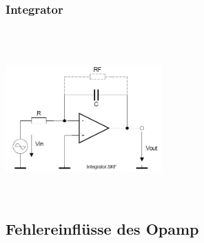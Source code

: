 		\subsubsection{Integrator } 
		\vspace{1cm}
		\begin{minipage}[b]{12cm}
		\hspace{8mm} \\
		\hspace{8mm} \\
		\end{minipage} 
		\begin{minipage}{6cm}
          	\includegraphics[width=6cm]{./bilder/integrator.png} 
        \end{minipage}\\

		\subsection{Fehlereinflüsse des Opamp }
